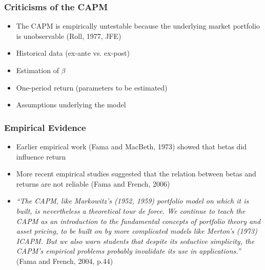 \documentclass[9pt,aspectratio=169]{beamer}
\begin{document}
\begin{frame}

\frametitle{\textnormal{Criticisms of the CAPM}}

\begin{itemize}
    \item The CAPM is empirically untestable because the underlying market portfolio is unobservable (Roll, 1977, JFE)
\item Historical data (ex-ante vs. ex-post)
\item Estimation of $\beta$
\item One-period return (parameters to be estimated)
\item Assumptions underlying the model

\end{itemize}

\end{frame}




\begin{frame}

\frametitle{\textnormal{Empirical Evidence}}

\begin{itemize}
    \item Earlier empirical work (Fama and MacBeth, 1973) showed that betas did influence return
\item More recent empirical studies suggested that the relation between betas and returns are not reliable (Fama and French, 2006)
\item \textit {“The CAPM, like Markowitz’s (1952, 1959) portfolio model on which it is built, is nevertheless a theoretical tour de force. We continue to teach the CAPM as an introduction to the fundamental concepts of portfolio theory and asset pricing, to be built on by more complicated models like Merton’s (1973) ICAPM. But we also warn students that despite its seductive simplicity, the CAPM’s empirical problems probably invalidate its use in applications.”} (Fama and French, 2004, p.44)


\end{itemize}
\end{frame}


\end{document}
